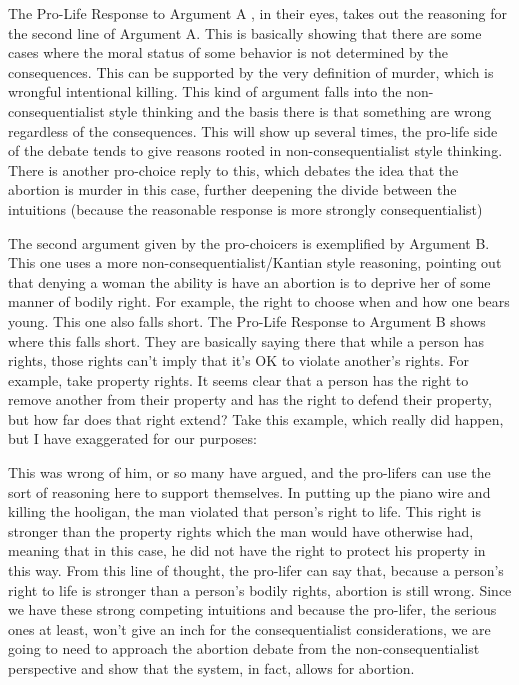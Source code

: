 The Pro-Life Response to Argument A , in their eyes, takes out the reasoning for the second line of Argument A. This is basically showing that there are some cases where the moral status of some behavior is not determined by the consequences. This can be supported by the very definition of murder, which is wrongful intentional killing. This kind of argument falls into the non-consequentialist style thinking and the basis there is that something are wrong regardless of the consequences. This will show up several times, the pro-life side of the debate tends to give reasons rooted in non-consequentialist style thinking. There is another pro-choice reply to this, which debates the idea that the abortion is murder in this case, further deepening the divide between the intuitions (because the reasonable response is more strongly consequentialist) 

The second argument given by the pro-choicers is exemplified by Argument B. This one uses a more non-consequentialist/Kantian style reasoning, pointing out that denying a woman the ability is have an abortion is to deprive her of some manner of bodily right. For example, the right to choose when and how one bears young. This one also falls short. The Pro-Life Response to Argument B shows where this falls short. They are basically saying there that while a person has rights, those rights can't imply that it's OK to violate another's rights. For example, take property rights. It seems clear that a person has the right to remove another from their property and has the right to defend their property, but how far does that right extend? Take this example, which really did happen, but I have exaggerated for our purposes:


This was wrong of him, or so many have argued, and the pro-lifers can use the sort of reasoning here to support themselves. In putting up the piano wire and killing the hooligan, the man violated that person's right to life. This right is stronger than the property rights which the man would have otherwise had, meaning that in this case, he did not have the right to protect his property in this way.  From this line of thought, the pro-lifer can say that, because a person's right to life is stronger than a person's bodily rights, abortion is still wrong.  Since we have these strong competing intuitions and because the pro-lifer, the serious ones at least, won't give an inch for the consequentialist considerations, we are going to need to approach the abortion debate from the non-consequentialist perspective and show that the system, in fact, allows for abortion.
